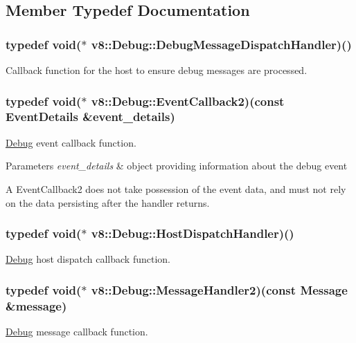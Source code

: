 \subsection{Member Typedef Documentation}
\hypertarget{classv8_1_1Debug_a0fe6dbc9393500d7e02cc12fae1c7f66}{
\subsubsection[{Debug\-Message\-Dispatch\-Handler}]{\setlength{\rightskip}{0pt plus 5cm}typedef void($\ast$ v8\-::\-Debug\-::\-Debug\-Message\-Dispatch\-Handler)()}}\label{classv8_1_1Debug_a0fe6dbc9393500d7e02cc12fae1c7f66}
Callback function for the host to ensure debug messages are processed. \hypertarget{classv8_1_1Debug_a7c7d64ad935a571c7ee374d8230a1ef7}{
\subsubsection[{Event\-Callback2}]{\setlength{\rightskip}{0pt plus 5cm}typedef void($\ast$ v8\-::\-Debug\-::\-Event\-Callback2)(const {\bf Event\-Details} \&event\-\_\-details)}}\label{classv8_1_1Debug_a7c7d64ad935a571c7ee374d8230a1ef7}
\hyperlink{classv8_1_1Debug}{Debug} event callback function.


\begin{DoxyParams}{Parameters}
{\em event\-\_\-details} & object providing information about the debug event\\
\hline
\end{DoxyParams}
A Event\-Callback2 does not take possession of the event data, and must not rely on the data persisting after the handler returns. \hypertarget{classv8_1_1Debug_a93a06401b4d8bbdd09f00ff9125578c3}{
\subsubsection[{Host\-Dispatch\-Handler}]{\setlength{\rightskip}{0pt plus 5cm}typedef void($\ast$ v8\-::\-Debug\-::\-Host\-Dispatch\-Handler)()}}\label{classv8_1_1Debug_a93a06401b4d8bbdd09f00ff9125578c3}
\hyperlink{classv8_1_1Debug}{Debug} host dispatch callback function. \hypertarget{classv8_1_1Debug_a76bad493edc528bbe9f0924dd54114ca}{
\subsubsection[{Message\-Handler2}]{\setlength{\rightskip}{0pt plus 5cm}typedef void($\ast$ v8\-::\-Debug\-::\-Message\-Handler2)(const {\bf Message} \&message)}}\label{classv8_1_1Debug_a76bad493edc528bbe9f0924dd54114ca}
\hyperlink{classv8_1_1Debug}{Debug} message callback function.


